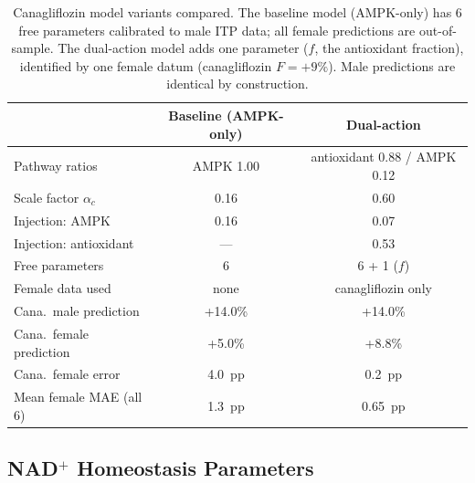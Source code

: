 \documentclass[11pt]{article}
\begin{document}
\begin{table}[H]
\centering
\caption{Canagliflozin model variants compared. The baseline model (AMPK-only) has 6 free parameters calibrated to male ITP data; all female predictions are out-of-sample. The dual-action model adds one parameter ($f$, the antioxidant fraction), identified by one female datum (canagliflozin $F = +9\%$). Male predictions are identical by construction.}
\label{tab:cana_variants}
\begin{tabular}{@{}lcc@{}}
\toprule
 & \textbf{Baseline (AMPK-only)} & \textbf{Dual-action} \\
\midrule
Pathway ratios & AMPK 1.00 & antioxidant 0.88 / AMPK 0.12 \\
Scale factor $\alpha_c$ & 0.16 & 0.60 \\
Injection: AMPK & 0.16 & 0.07 \\
Injection: antioxidant & --- & 0.53 \\
\midrule
Free parameters & 6 & 6 + 1 ($f$) \\
Female data used & none & canagliflozin only \\
\midrule
Cana.\ male prediction & +14.0\% & +14.0\% \\
Cana.\ female prediction & +5.0\% & +8.8\% \\
Cana.\ female error & 4.0~pp & 0.2~pp \\
Mean female MAE (all 6) & 1.3~pp & 0.65~pp \\
\bottomrule
\end{tabular}
\end{table}

\subsection{NAD$^+$ Homeostasis Parameters}
\end{document}
